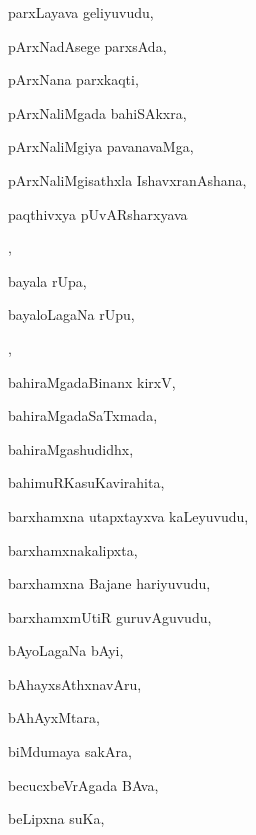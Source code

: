 \begin{multicols}{3}
{\noindent
{parxLayava geliyuvudu}, \pageref{parxLayava geliyuvudu}

\noindent
{pArxNadAsege parxsAda}, \pageref{pArxNadAsege parxsAda}

\noindent
{pArxNana parxkaqti}, \pageref{pArxNana parxkaqti}

\noindent
{pArxNaliMgada bahiSAkxra}, \pageref{pArxNaliMgada bahiSAkxra}

\noindent
{pArxNaliMgiya pavanavaMga}, \pageref{pArxNaliMgiya pavanavaMga}

\noindent
{pArxNaliMgisathxla IshavxranAshana}, \pageref{pArxNaliMgisathxla IshavxranAshana}

\noindent
{paqthivxya pUvARsharxyava}

\noindent
{}, \pageref{paqthivxya pUvARsharxyava kaLeyuvudu}

\noindent
{bayala rUpa}, \pageref{bayala rUpa}

\noindent
{bayaloLagaNa rUpu,}

\noindent
{}, \pageref{bayaloLagaNa rUpu, rUpinoLagaNa bayalu}

\noindent
{bahiraMgadaBinanx kirxV}, \pageref{bahiraMgadaBinanx kirxV}

\noindent
{bahiraMgadaSaTxmada}, \pageref{bahiraMgadaSaTxmada}

\noindent
{bahiraMgashudidhx}, \pageref{bahiraMgashudidhx}

\noindent
{bahimuRKasuKavirahita}, \pageref{bahimuRKasuKavirahita}

\noindent
{barxhamxna utapxtayxva kaLeyuvudu}, \pageref{barxhamxna utapxtayxva kaLeyuvudu}

\noindent
{barxhamxnakalipxta}, \pageref{barxhamxnakalipxta}

\noindent
{barxhamxna Bajane hariyuvudu}, \pageref{barxhamxna Bajane hariyuvudu}

\noindent
{barxhamxmUtiR guruvAguvudu}, \pageref{barxhamxmUtiR guruvAguvudu}

\noindent
{bAyoLagaNa bAyi}, \pageref{bAyoLagaNa bAyi}

\noindent
{bAhayxsAthxnavAru}, \pageref{bAhayxsAthxnavAru}

\noindent
{bAhAyxMtara}, \pageref{bAhAyxMtara}

\noindent
{biMdumaya sakAra}, \pageref{biMdumaya sakAra}

\noindent
{becucxbeVrAgada BAva}, \pageref{becucxbeVrAgada BAva}

\noindent
{beLipxna suKa}, \pageref{beLipxna suKa}

}
\end{multicols}
